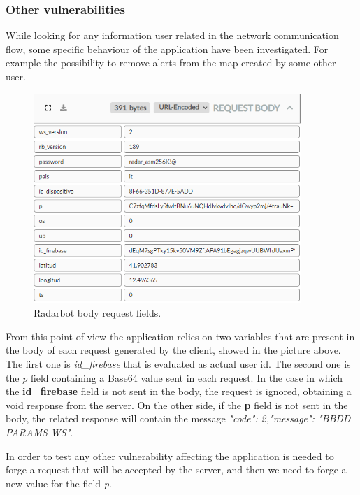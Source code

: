 	\subsubsection{Other vulnerabilities}
		\par While looking for any information user related in the network communication flow, some specific behaviour of the application have been investigated. For example the possibility to remove alerts from the map created by some other user. \newline
		\begin{figure}[H]
			\centering
			\includegraphics[width=0.9\textwidth]{images/radarbot_request.png}
			\caption{Radarbot body request fields.}
		\end{figure}
		\par From this point of view the application relies on two variables that are present in the body of each request generated by the client, showed in the picture above. The first one is \textit{id\_firebase} that is evaluated as actual user id. The second one is the \textit{p} field containing a Base64 value sent in each request. \newline
		In the case in which the \textbf{id\_firebase} field is not sent in the body, the request is ignored, obtaining a void response from the server. \newline
		On the other side, if the \textbf{p} field is not sent in the body, the related response will contain the message \textit{"code": 2,"message": "BBDD PARAMS WS"}. \newline
		\par In order to test any other vulnerability affecting the application is needed to forge a request that will be accepted by the server, and then we need to forge a new value for the field \textit{p}.
		
